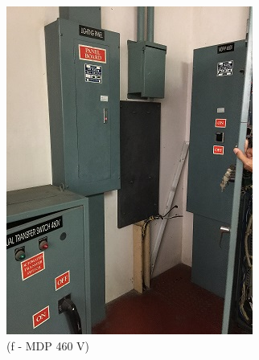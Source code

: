 \begin{figure}
\begin{minipage}[b]{0.22\linewidth}
		\includegraphics[width=\textwidth]{figures/asv_visual_mdp460v}
		\caption*{(f - MDP 460 V)}
	\end{minipage}
	\hspace{0.03cm}
	\begin{minipage}[b]{0.22\linewidth}

\end{minipage}
\end{figure}

